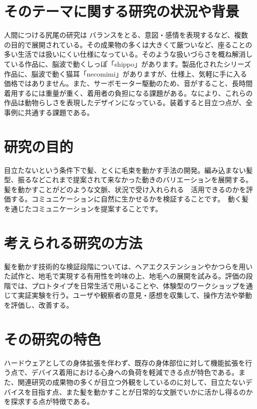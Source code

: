 \documentclass[a4paper]{jsarticle}
\begin{document}
\section{そのテーマに関する研究の状況や背景}
人間につける尻尾の研究は
バランスをとる\cite{Augmenting Human With a Tail}、意図・感情を表現する\cite{Augmenting Human With a Tail}など、複数の目的で展開されている。その成果物の多くは大きくて厳ついなど、座ることの多い生活では扱いにくい仕様になっている。そのような扱いづらさを概ね解消している作品に、脳波で動くしっぽ「shippo」\cite{necomimi}があります。製品化されたシリーズ作品に、脳波で動く猫耳「necomimi」\cite{necomimi}がありますが、仕様上、気軽に手に入る価格ではありません。また、サーボモーター駆動のため、音がすること、長時間着用するには重量が重く、着用者の負担になる課題がある。なにより、これらの作品は動物らしさを表現したデザインになっている。装着すると目立つ点が、全事例に共通する課題である。%

\section{研究の目的} 
目立たないという条件下で髪、とくに毛束を動かす手法の開発。編み込まない髪型、振るなどこれまで提案されて来なかった動きのバリエーションを展開する。髪を動かすことがどのような文脈、状況で受け入れられる　活用できるのかを評価する。コミュニケーションに自然に生かせるかを検証することです。　動く髪を通じたコミュニケーションを提案することです。

\section{考えられる研究の方法} 
髪を動かす技術的な検証段階については、ヘアエクステンションやかつらを用いた試作と、地毛で実現する有用性を吟味の上、地毛への展開を試みる。評価の段階では、プロトタイプを日常生活で用いることや、体験型のワークショップを通じて実証実験を行う。ユーザや観察者の意見・感想を収集して、操作方法や挙動を評価し、改善する。

\section{その研究の特色}
ハードウェアとしての身体拡張を伴わず、既存の身体部位に対して機能拡張を行う点で、デバイス着用における心身への負荷を軽減できる点が特色である。また、関連研究の成果物の多くが目立つ外観をしているのに対して、目立たないデバイスを目指す点、また髪を動かすことが日常的な文脈でいかに活かし得るのかを探求する点が特徴である。
\end{document}
